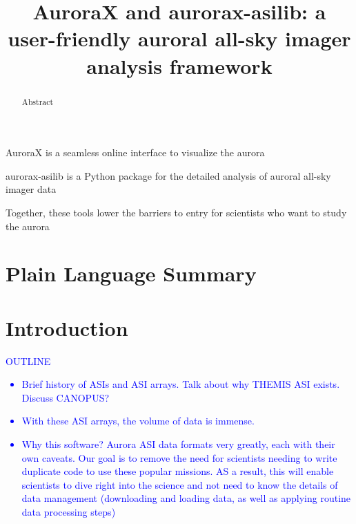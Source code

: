 \documentclass[draft]{agujournal2019}
\begin{document}
\title{AuroraX and aurorax-asilib: a user-friendly auroral all-sky imager analysis framework}





\begin{keypoints}
\item AuroraX is a seamless online interface to visualize the aurora
\item aurorax-asilib is a Python package for the detailed analysis of auroral all-sky imager data 
\item Together, these tools lower the barriers to entry for scientists who want to study the aurora 
\end{keypoints}


\begin{abstract}
Abstract
\end{abstract}


\section*{Plain Language Summary}
\noindent


\section{Introduction}\label{intro}
\textcolor{blue}{
      OUTLINE
      \begin{itemize}
            \item Brief history of ASIs and ASI arrays. Talk about why THEMIS ASI exists. Discuss CANOPUS?
            \item With these ASI arrays, the volume of data is immense.
            \item Why this software? Aurora ASI data formats very greatly, each with their own caveats. Our goal is to remove the need for scientists needing to write duplicate code to use these popular missions. AS a result, this will enable scientists to dive right into the science and not need to know the details of data management (downloading and loading data, as well as applying routine data processing steps)   
      \end{itemize}
}
\end{document}
